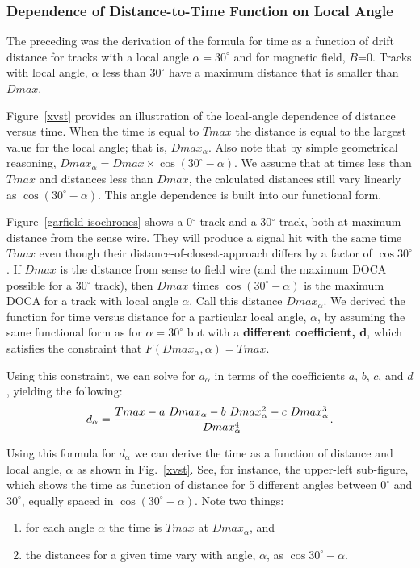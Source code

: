 \subsubsection{Dependence of Distance-to-Time Function on Local Angle}

The preceding was the derivation of the formula for time as a function
of drift distance for tracks with a local angle $\alpha = 30^\circ$ and for magnetic field, $B$=0.
Tracks with local angle, $\alpha$ less than $30^\circ$ have a maximum distance that is
smaller than $Dmax$.  

Figure~\ref{xvst} provides an illustration of the local-angle dependence
of distance versus time.  When the time is equal to $Tmax$ the distance is equal to
the largest value for the local angle; that is, $Dmax_{\alpha}$.  Also note that by
simple geometrical reasoning, $Dmax_{\alpha} = Dmax \times \cos(30^\circ-\alpha)$.
We assume that at times less than $Tmax$ and distances less than $Dmax$, the calculated
distances still vary linearly as $\cos(30^\circ-\alpha)$.  This angle dependence is built into
our functional form.

Figure~\ref{garfield-isochrones} shows a 0$^\circ$ track and a 30$^\circ$ track, both at maximum
distance from the sense wire. They will produce
a signal hit with the same time $Tmax$ even though their distance-of-closest-approach 
differs by a factor of $\cos 30^\circ$.  If $Dmax$ is the distance from sense to field wire (and the maximum
DOCA possible for a 30$^\circ$ track), then $Dmax$ times $\cos(30^\circ-\alpha)$ is the maximum
DOCA for a track with local angle $\alpha$.  Call this distance $Dmax_{\alpha}$.  
We derived the function for time versus distance for a particular local angle, $\alpha$, by
assuming the same functional form as for $\alpha = 30^\circ$ but 
with a {\bf different coefficient, d}, which 
satisfies the constraint that  $F(Dmax_{\alpha},\alpha) = Tmax$.

Using this constraint, we can solve for $a_{\alpha}$ in terms of the coefficients $a$, $b$, $c$, and $d$,
yielding the following:
\begin{equation}
\label{aalphaequation}
d_{\alpha} = {{Tmax - a ~Dmax_{\alpha} - b ~Dmax_{\alpha}^2 - c ~Dmax_{\alpha}^3}\over{Dmax_{\alpha}^4}}.
\end{equation}

Using this formula for $d_{\alpha}$ we can derive the time as a function of distance and local
angle, $\alpha$ as shown in Fig.~\ref{xvst}.  See, for instance, the upper-left sub-figure, 
which shows the time as function of distance for 5 different angles between $0^\circ$ and 
$30^\circ$, equally spaced in $\cos (30^\circ-\alpha)$.  Note two things:
\begin{enumerate}
\item for each angle $\alpha$ the time is $Tmax$ at $Dmax_{\alpha}$, and
\item the distances for a given time vary with angle, $\alpha$, as $\cos 30^\circ-\alpha$.
\end{enumerate}

